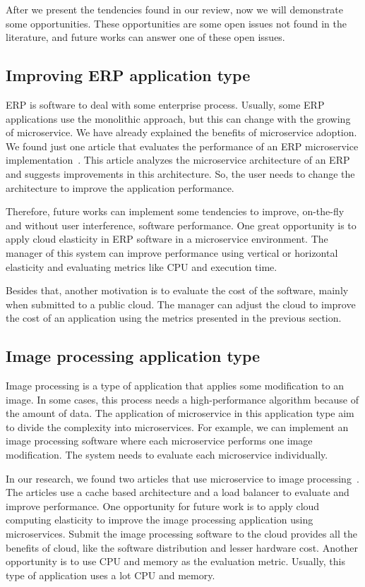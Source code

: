 After we present the tendencies found in our review, now we will demonstrate some opportunities. These opportunities are some open issues not found in the literature, and future works can answer one of these open issues.

\subsection{Improving ERP application type}
ERP is software to deal with some enterprise process. Usually, some ERP applications use the monolithic approach, but this can change with the growing of microservice. We have already explained the benefits of microservice adoption. We found just one article that evaluates the performance of an ERP microservice implementation~\cite{Klock2017}. This article analyzes the microservice architecture of an ERP and suggests improvements in this architecture. So, the user needs to change the architecture to improve the application performance. 

Therefore, future works can implement some tendencies to improve, on-the-fly and without user interference, software performance. One great opportunity is to apply cloud elasticity in ERP software in a microservice environment. The manager of this system can improve performance using vertical or horizontal elasticity and evaluating metrics like CPU and execution time. 

Besides that, another motivation is to evaluate the cost of the software, mainly when submitted to a public cloud. The manager can adjust the cloud to improve the cost of an application using the metrics presented in the previous section. 

\subsection{Image processing application type}
Image processing is a type of application that applies some modification to an image. In some cases, this process needs a high-performance algorithm because of the amount of data. The application of microservice in this application type aim to divide the complexity into microservices. For example, we can implement an image processing software where each microservice performs one image modification. The system needs to evaluate each microservice individually. 

In our research, we found two articles that use microservice to image processing~\cite{Perez2018, Benchara2017}. The articles use a cache based architecture and a load balancer to evaluate and improve performance. One opportunity for future work is to apply cloud computing elasticity to improve the image processing application using microservices. Submit the image processing software to the cloud provides all the benefits of cloud, like the software distribution and lesser hardware cost. Another opportunity is to use CPU and memory as the evaluation metric. Usually, this type of application uses a lot CPU and memory.

